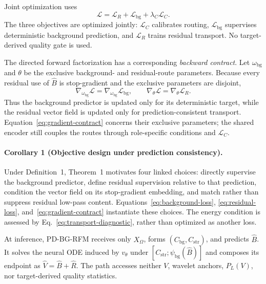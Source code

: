 \documentclass[letterpaper]{article}
\begin{document}
Joint optimization uses
\begin{equation}
\mathcal L=\mathcal L_R+\mathcal L_{\mathrm{bg}}+\lambda_C\mathcal L_C.
\label{eq:total-loss}
\end{equation}
The three objectives are optimized jointly: $\mathcal L_C$ calibrates routing, $\mathcal L_{\mathrm{bg}}$ supervises deterministic background prediction, and $\mathcal L_R$ trains residual transport. No target-derived quality gate is used.

The directed forward factorization has a corresponding \emph{backward contract}. Let $\omega_{\mathrm{bg}}$ and $\theta$ be the exclusive background- and residual-route parameters. Because every residual use of $\hat B$ is stop-gradient and the exclusive parameters are disjoint,
\begin{equation}
\nabla_{\omega_{\mathrm{bg}}}\mathcal L=\nabla_{\omega_{\mathrm{bg}}}\mathcal L_{\mathrm{bg}},
\qquad
\nabla_{\theta}\mathcal L=\nabla_{\theta}\mathcal L_R.
\label{eq:gradient-contract}
\end{equation}
Thus the background predictor is updated only for its deterministic target, while the residual vector field is updated only for prediction-consistent transport. Equation~\ref{eq:gradient-contract} concerns their exclusive parameters; the shared encoder still couples the routes through role-specific conditions and $\mathcal L_C$.

\paragraph{Corollary 1 (Objective design under prediction consistency).}
Under Definition~1, Theorem~1 motivates four linked choices: directly supervise the background predictor, define residual supervision relative to that prediction, condition the vector field on its stop-gradient embedding, and match rather than suppress residual low-pass content. Equations~\ref{eq:background-loss}, \ref{eq:residual-loss}, and~\ref{eq:gradient-contract} instantiate these choices. The energy condition is assessed by Eq.~\ref{eq:transport-diagnostic}, rather than optimized as another loss.

At inference, PD-BG-RFM receives only $X_\Omega$, forms $(C_{\mathrm{bg}},C_{\mathrm{str}})$, and predicts $\hat B$. It solves the neural ODE \cite{chen2018neuralode} induced by $v_\theta$ under $[C_{\mathrm{str}};\psi_{\mathrm{bg}}(\hat B)]$ and composes its endpoint as $\hat V=\hat B+\hat R$. The path accesses neither $V$, wavelet anchors, $P_L(V)$, nor target-derived quality statistics.
\end{document}
